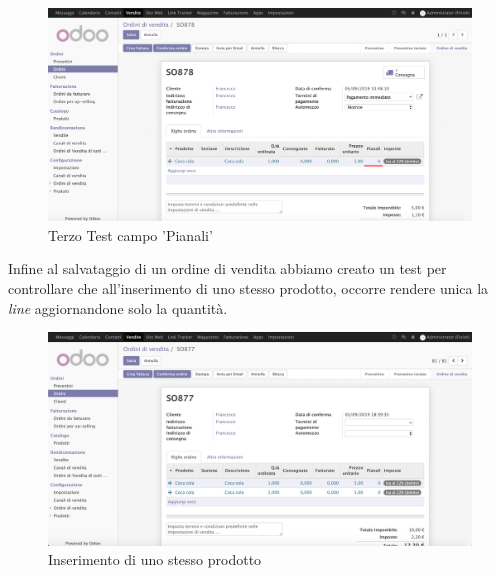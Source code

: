 \begin{figure}[H]
	\begin{center} \includegraphics[scale=0.3]{figures/seventh_test}
		\caption[Terzo Test campo 'Pianali']{Terzo Test campo 'Pianali'}
		\label{fig:seventh_test}
	\end{center}
\end{figure}

\newpage
Infine al salvataggio di un ordine di vendita abbiamo creato un test per controllare che all'inserimento di uno stesso prodotto, occorre rendere unica la \textit{line} aggiornandone solo la quantità.

\begin{figure}[H]
	\begin{center} \includegraphics[scale=0.3]{figures/ctrl_1}
		\caption[Inserimento di uno stesso prodotto]{Inserimento di uno stesso prodotto}
		\label{fig:ctrl_1}
	\end{center}
\end{figure}

